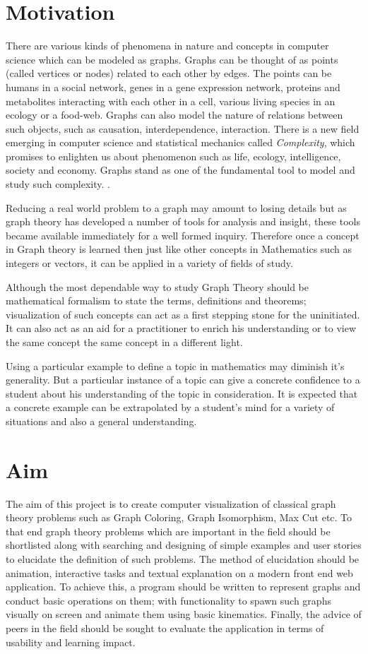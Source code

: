 
\section{Motivation}
There are various kinds of phenomena in nature and concepts in computer science which can
be modeled as graphs. Graphs can be thought of as points (called vertices or
nodes) related to each other by edges. The points can be humans in a social
network, genes in a gene expression network, proteins and metabolites
interacting with each other in a cell, various living species in an ecology or
a food-web. Graphs can also model the nature of relations between such objects, such as causation,
interdependence, interaction.  There is a new field emerging in computer science
and statistical mechanics called \emph{Complexity}, which promises to enlighten
us about phenomenon such as life, ecology, intelligence, society and economy.
Graphs stand as one of the fundamental tool to model and study such complexity. \cite{Gros2015}.

Reducing a real world problem to a graph may amount to losing details but as
graph theory has developed a number of tools for analysis and insight, these
tools became available immediately for a well formed inquiry. Therefore once a
concept in Graph theory is learned then just like other concepts in Mathematics
such as integers or vectors, it can be applied in a variety of fields of
study.

Although the most dependable way to study Graph Theory should be mathematical
formalism to state the terms, definitions and theorems; visualization of such
concepts can act as a first stepping stone for the uninitiated. It can also act
as an aid for a practitioner to enrich his understanding or to view the same
concept the same concept in a different light.

Using a particular example to define a topic in mathematics may diminish it's
generality. But a particular instance of a topic can give a concrete confidence
to a student about his understanding of the topic in consideration. It is
expected that a concrete example can be extrapolated by a student's mind for a
variety of situations and also a general understanding.

\section{Aim}
The aim of this project is to create computer visualization of classical graph
theory problems such as Graph Coloring, Graph Isomorphism, Max Cut etc. 
To that end graph theory problems which are important in the
field should be shortlisted along with searching and designing of simple
examples and user stories to elucidate the definition of such problems.
The method of elucidation should be animation, interactive tasks and textual
explanation on a modern front end web application. To achieve this, a program
should be written to represent graphs and conduct basic operations on them;
with functionality to spawn such graphs visually on screen and
animate them using basic kinematics. Finally, the advice of peers in the field should be sought to evaluate the
application in terms of usability and learning impact.

